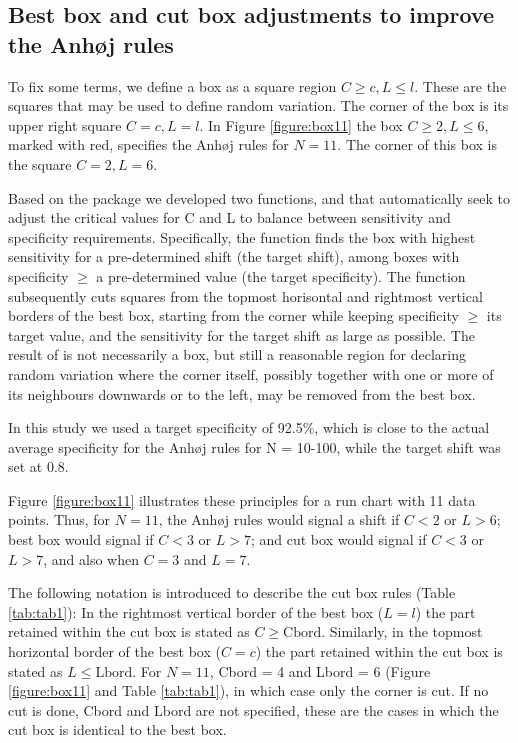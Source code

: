 \hypertarget{best-box-and-cut-box-adjustments-to-improve-the-anhj-rules}{%
\subsection{Best box and cut box adjustments to improve the Anhøj
rules}\label{best-box-and-cut-box-adjustments-to-improve-the-anhj-rules}}

To fix some terms, we define a box as a square region
\(C \geq c, L \leq l\). These are the squares that may be used to define
random variation. The corner of the box is its upper right square
\(C = c, L = l\). In Figure \ref{figure:box11} the box
\(C \geq 2, L \leq 6\), marked with red, specifies the Anhøj rules for
\(N=11\). The corner of this box is the square \(C = 2, L = 6\).

Based on the  package we developed two functions,
 and  that automatically seek to adjust
the critical values for C and L to balance between sensitivity and
specificity requirements. Specifically, the  function
finds the box with highest sensitivity for a pre-determined shift (the
target shift), among boxes with specificity \(\geq\) a pre-determined
value (the target specificity). The  function
subsequently cuts squares from the topmost horisontal and rightmost
vertical borders of the best box, starting from the corner while keeping
specificity \(\geq\) its target value, and the sensitivity for the
target shift as large as possible. The result of  is not
necessarily a box, but still a reasonable region for declaring random
variation where the corner itself, possibly together with one or more of
its neighbours downwards or to the left, may be removed from the best
box.

In this study we used a target specificity of 92.5\%, which is close to
the actual average specificity for the Anhøj rules for N = 10-100, while
the target shift was set at 0.8.

Figure \ref{figure:box11} illustrates these principles for a run chart
with 11 data points. Thus, for \(N = 11\), the Anhøj rules would signal
a shift if \(C < 2\) or \(L > 6\); best box would signal if \(C < 3\) or
\(L > 7\); and cut box would signal if \(C < 3\) or \(L > 7\), and also
when \(C = 3\) and \(L = 7\).

The following notation is introduced to describe the cut box rules
(Table \ref{tab:tab1}): In the rightmost vertical border of the best box
(\(L = l\)) the part retained within the cut box is stated as
\(C\geq \text{Cbord}\). Similarly, in the topmost horizontal border of
the best box (\(C = c\)) the part retained within the cut box is stated
as \(L \leq \text{Lbord}\). For \(N = 11\), Cbord = 4 and Lbord = 6
(Figure \ref{figure:box11} and Table \ref{tab:tab1}), in which case only
the corner is cut. If no cut is done, Cbord and Lbord are not specified,
these are the cases in which the cut box is identical to the best box.

